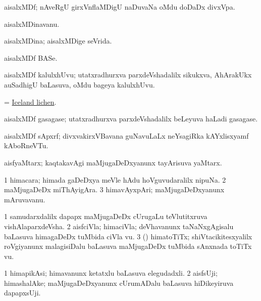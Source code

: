 \bentry
{}
\gl{\nA}
\bmng
aisalxMDf; nAveRgU girxVnflaMDigU naDuvaNa oMdu doDaDx divxVpa. 
\emng
\eentry

\bentry
{}
\gl{\nA}
\bmng
aisalxMDinavanu. 
\emng
\eentry

\bentry
{}
\gl{\gu}
\bmng
aisalxMDina; aisalxMDige seVrida. 
\emng
\eentry

\bentry
{}
\gl{\nA}
\bmng
aisalxMDf BASe. 
\emng
\eentry

\bentry
{}
\gl{\nA}
\bmng
aisalxMDf kalulxhUvu; utatxradhurxva parxdeVshadalilx sikukxva, AhArakUkx auSadhigU baLasuva, oMdu bageya kalulxhUvu. 
\emng
\eentry

\bentry
{}
\gl{\nA}
\bmng
 = \hyperlink{Iceland lichen}{Iceland lichen}. 
\emng
\eentry

\bentry
{}
\gl{\nA}
\bmng
aisalxMDf gasagase; utatxradhurxva parxdeVshadalilx beLeyuva haLadi gasagase. 
\emng
\eentry

\bentry
{}
\gl{\nA}
\bmng
aisalxMDf sApxrf; divxvakirxVBavana guNavuLaLx neYsagiRka kAYxlisxyamf kAboRneVTu. 
\emng
\eentry

\bentry
{}
\gl{\nA}
\bmng
aisfyaMtarx; kaqtakavAgi maMjugaDeDxyanunx tayArisuva yaMtarx. 
\emng
\eentry

\bentry
{}
\gl{\nA}
\bmng
\bnum
\num{1} himacara; himada gaDeDxya meVle hAdu hoVguvudaralilx nipuNa. 
\num{2} maMjugaDeDx miThAyigAra. 
\num{3} himavAyxpAri; maMjugaDeDxyanunx mAruvavanu. 
\enum
\emng
\eentry

\bentry
{}
\gl{\nA}
\bmng
\bnum
\num{1} samudarxdalilx dapapx maMjugaDeDx cUrugaLu teVlutitxruva vishAlaparxdeVsha. 
\hypertarget{ice-pack(2)}{} 
\num{2} aisfciVla; himaciVla; deVhavanunx taNaNxgAgisalu baLasuva himagaDeDx tuMbida ciVla \mo vu. 
\num{3} (\veYshA) himatoTiTx; shiVtacikitesxyalilx roVgiyanunx malagisiDalu baLasuva maMjugaDeDx tuMbida sAnxnada toTiTx \mo vu. 
\enum
\emng
\eentry

\bentry
{}
\gl{\nA}
\bmng
\bnum
\num{1} himapikAsi; himavanunx ketatxlu baLasuva elegudadxli. 
\num{2} aisfsUji; himashalAke; maMjugaDeDxyanunx cUrumADalu baLasuva hiDikeyiruva dapapxsUji. 
\enum
\emng
\eentry

